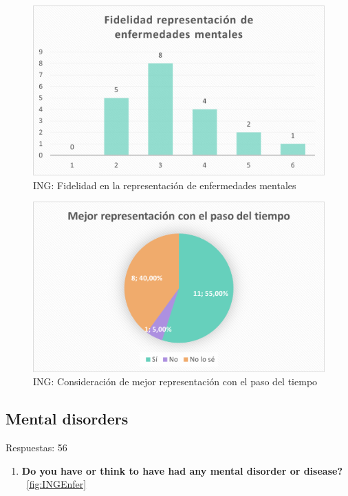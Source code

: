 \documentclass[12pt, a4paper,twoside,titlepage]{book}
\begin{document}
\begin{figure}
    \centering
    \includegraphics[width=.8\linewidth]{ANEXO ING/17AnexINGFid}
    \caption{ING: Fidelidad en la representación de enfermedades mentales}
    \label{fig:INGFidel}
\end{figure}

\begin{figure}
    \centering
    \includegraphics[width=.8\linewidth]{ANEXO ING/18AnexINGMejor}
    \caption{ING: Consideración de mejor representación con el paso del tiempo}
    \label{fig:INGMejor}
\end{figure}





\subsection{Mental disorders}
Respuestas: 56
\begin{enumerate}[label=\textbf{\arabic*}.]
     \item \textbf{Do you have or think to have had any mental disorder or disease? }\\
    ~\ref{fig:INGEnfer}
\end{enumerate}
\end{document}
